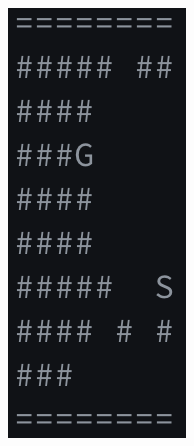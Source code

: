 \documentclass{article}
\begin{document}
\begin{figure}
\begin{subfigure}{0.2\textwidth}
\includegraphics[width=0.8\linewidth]{sg-2.png}
\end{subfigure}
\begin{subfigure}{0.2\textwidth}
  \centering

\end{subfigure}
\end{figure}
\end{document}

